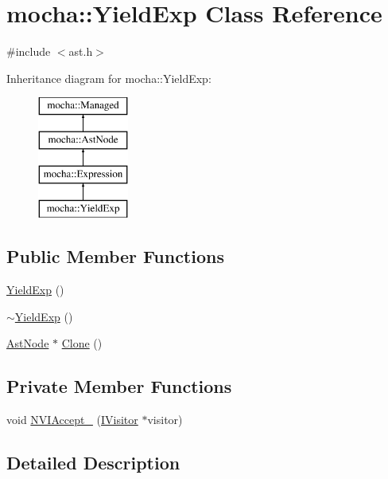 \hypertarget{classmocha_1_1_yield_exp}{
\section{mocha::YieldExp Class Reference}
\label{classmocha_1_1_yield_exp}
}


{\ttfamily \#include $<$ast.h$>$}

Inheritance diagram for mocha::YieldExp:\begin{figure}[H]
\begin{center}
\leavevmode
\includegraphics[height=4.000000cm]{classmocha_1_1_yield_exp}
\end{center}
\end{figure}
\subsection*{Public Member Functions}
\begin{DoxyCompactItemize}
\item 
\hyperlink{classmocha_1_1_yield_exp_a548d7ef8ab8562518512db6a8aff3eee}{YieldExp} ()
\item 
\hyperlink{classmocha_1_1_yield_exp_a8dc6dafc23f931979441d2169eeb3d0c}{$\sim$YieldExp} ()
\item 
\hyperlink{classmocha_1_1_ast_node}{AstNode} $\ast$ \hyperlink{classmocha_1_1_yield_exp_ae72bb8f5e255bac1eaa2ba479d7c7b85}{Clone} ()
\end{DoxyCompactItemize}
\subsection*{Private Member Functions}
\begin{DoxyCompactItemize}
\item 
void \hyperlink{classmocha_1_1_yield_exp_af9a03b0800ca3fa93bab22231245bb94}{NVIAccept\_\-} (\hyperlink{classmocha_1_1_i_visitor}{IVisitor} $\ast$visitor)
\end{DoxyCompactItemize}


\subsection{Detailed Description}


